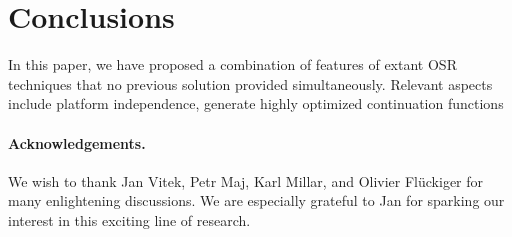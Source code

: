 
\section{Conclusions}
\label{se:conclusions}

In this paper, we have proposed a combination of features of extant OSR techniques that no previous solution provided simultaneously. Relevant aspects include platform independence, generate highly optimized continuation functions


\ifx\noauthorea\undefined
\paragraph{Acknowledgements.}

We wish to thank Jan Vitek, Petr Maj, Karl Millar, and Olivier Fl{\"u}ckiger for many enlightening discussions. We are especially grateful to Jan for sparking our interest in this exciting line of research. %
\fi
